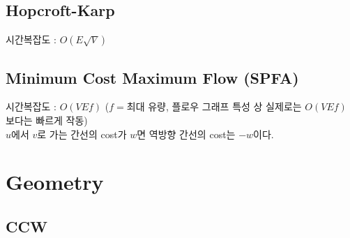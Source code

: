 \documentclass[10pt,landscape,a4paper,twocolumn]{article}
\begin{document}
%

\subsection{Hopcroft-Karp}
시간복잡도 : $O(E\sqrt{V})$


\subsection{Minimum Cost Maximum Flow (SPFA)}
시간복잡도 : $O(VEf)$ \hspace{1em} ($f=$최대 유량, 플로우 그래프 특성 상 실제로는 $O(VEf)$ 보다는 빠르게 작동)\\
\hspace{1em}$u$에서 $v$로 가는 간선의 cost가 $w$면 역방향 간선의 cost는 $-w$이다.



%
%


\section{Geometry}
\subsection{CCW}


\iffalse
\subsection{Vector Class}

\fi
\end{document}
